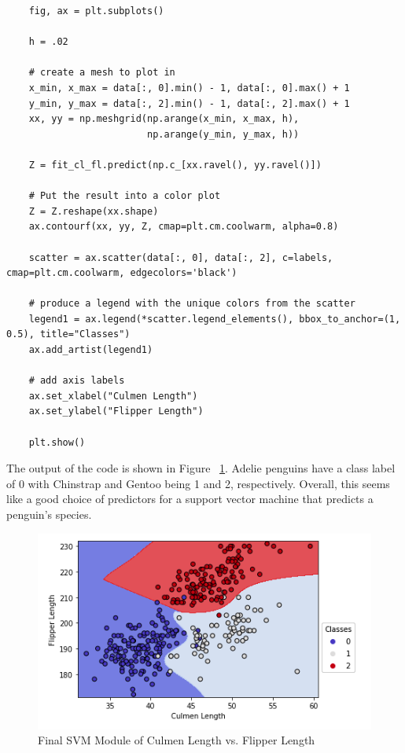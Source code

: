 \documentclass[12pt]{article}
\begin{document}
\begin{verbatim}
    fig, ax = plt.subplots()

    h = .02
    
    # create a mesh to plot in
    x_min, x_max = data[:, 0].min() - 1, data[:, 0].max() + 1
    y_min, y_max = data[:, 2].min() - 1, data[:, 2].max() + 1
    xx, yy = np.meshgrid(np.arange(x_min, x_max, h),
                         np.arange(y_min, y_max, h))
    
    Z = fit_cl_fl.predict(np.c_[xx.ravel(), yy.ravel()])
    
    # Put the result into a color plot
    Z = Z.reshape(xx.shape)
    ax.contourf(xx, yy, Z, cmap=plt.cm.coolwarm, alpha=0.8)
    
    scatter = ax.scatter(data[:, 0], data[:, 2], c=labels, cmap=plt.cm.coolwarm, edgecolors='black')
    
    # produce a legend with the unique colors from the scatter
    legend1 = ax.legend(*scatter.legend_elements(), bbox_to_anchor=(1, 0.5), title="Classes")
    ax.add_artist(legend1)
    
    # add axis labels
    ax.set_xlabel("Culmen Length")
    ax.set_ylabel("Flipper Length")
    
    plt.show()      
\end{verbatim}

The output of the code is shown in Figure ~\ref{fig_fit_cl_fl}. Adelie penguins have a class label of 0 with Chinstrap and Gentoo being 1 and 2, respectively. Overall, this seems like a good choice of predictors for a support vector machine that predicts a penguin's species.

\begin{figure}[H]
    \centering
    \includegraphics[width=5in]{Figures/penguins/fit_cl_fl.png}
    \caption{Final SVM Module of Culmen Length vs. Flipper Length}
    \label{fig_fit_cl_fl}
\end{figure}
\end{document}
